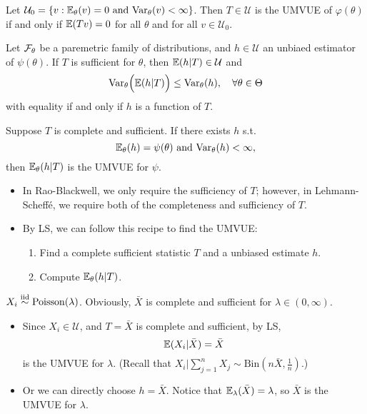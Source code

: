 \begin{thm}
	Let $\mathcal{U}_0 = \{ v: \mathbb{E}_\theta(v) = 0 \text{ and } \mathrm{Var}_\theta (v) < \infty \}$. Then $T \in \mathcal{U}$ is the UMVUE of $\varphi(\theta)$ if and only if $\mathbb{E}(Tv) = 0$ for all $\theta$ and for all $v \in \mathcal{U}_0$.
\end{thm}


\begin{thm}
	Let $\mathcal{F}_\theta$ be a paremetric family of distributions, and $h\in \mathcal{U}$ an unbiaed estimator of $\psi(\theta)$. If $T$ is sufficient for $\theta$, then $\mathbb{E}(h|T) \in \mathcal{U}$ and
	$$ \mathrm{Var}_\theta \Big( \mathbb{E}(h|T) \Big) \leq \mathrm{Var}_\theta (h),\quad \forall \theta \in \Theta$$
	with equality if and only if $h$ is a function of $T$.
\end{thm}

{\color{blue}
\begin{thm}
	Suppose $T$ is complete and sufficient. If there exists $h$ s.t. 
	$$\mathbb{E}_\theta (h) = \psi (\theta) \text{ and } \mathrm{Var}_\theta (h) < \infty, $$
	then $\mathbb{E}_\theta(h | T)$ is the UMVUE for $\psi$.
\end{thm}
}
\begin{remark}
	\begin{itemize} \textbf{ }
		\item In Rao-Blackwell, we only require the sufficiency of $T$; however, in Lehmann-Scheff\'e, we require both of the completeness and sufficiency of $T$. 
		\item By LS, we can follow this recipe to find the UMVUE:
		\begin{enumerate}
			\item Find a complete sufficient statistic $T$ and a unbiased estimate $h$.
			\item Compute $\mathbb{E}_\theta(h | T)$.
		\end{enumerate}
	\end{itemize} 
\end{remark}

 \begin{exap}
	$X_i \stackrel{\text{iid}}{\sim} \mathrm{Poisson}(\lambda)$.  Obviously, $\bar{X}$ is complete and sufficient for $\lambda \in (0,\infty)$.
	
	\begin{itemize}
		\item Since $X_i \in \mathcal{U}$, and $T = \bar{X}$ is complete and sufficient, by LS, 
		$$\mathbb{E}(X_i | \bar{X}) = \bar{X}$$
		is the UMVUE for $\lambda$. (Recall that $X_i| \sum_{j=1}^n X_j \sim \mathrm{Bin}(n\bar{X}, \frac{1}{n})$.)
		
		\item Or we can directly choose $h = \bar{X}$. Notice that $\mathbb{E}_\lambda (\bar{X}) = \lambda$, so $\bar{X}$ is the UMVUE for $\lambda$.
	\end{itemize}  
	
	
\end{exap}


